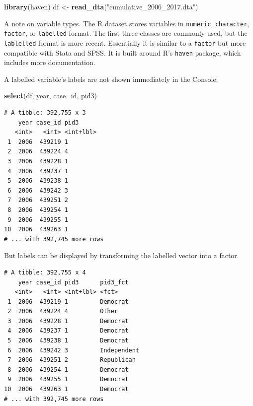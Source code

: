 \documentclass[10pt,article,oneside]{memoir}
\theoremstyle{definition}
\newenvironment{Shaded}{\begin{snugshade}}{\end{snugshade}}
\newcommand{\DataTypeTok}[1]{\textcolor[rgb]{0.13,0.29,0.53}{#1}}
\newcommand{\KeywordTok}[1]{\textcolor[rgb]{0.13,0.29,0.53}{\textbf{#1}}}
\newcommand{\NormalTok}[1]{#1}
\newcommand{\OperatorTok}[1]{\textcolor[rgb]{0.81,0.36,0.00}{\textbf{#1}}}
\newcommand{\StringTok}[1]{\textcolor[rgb]{0.31,0.60,0.02}{#1}}
\begin{document}
\begin{Shaded}
\begin{Highlighting}[]
\KeywordTok{library}\NormalTok{(haven)}
\NormalTok{df <-}\StringTok{ }\KeywordTok{read_dta}\NormalTok{(}\StringTok{"cumulative_2006_2017.dta"}\NormalTok{)}
\end{Highlighting}
\end{Shaded}

A note on variable types. The R dataset stores variables in
\texttt{numeric}, \texttt{character}, \texttt{factor}, or
\texttt{labelled} format. The first three classes are commonly used, but
the \texttt{lablelled} format is more recent. Essentially it is similar
to a \texttt{factor} but more compatible with Stata and SPSS. It is
built around R's \texttt{haven} package, which includes more
documentation.

A labelled variable's labels are not shown immediately in the Console:

\begin{Shaded}
\begin{Highlighting}[]
\KeywordTok{select}\NormalTok{(df, year, case_id, pid3)}
\end{Highlighting}
\end{Shaded}

\begin{verbatim}
# A tibble: 392,755 x 3
    year case_id pid3     
   <int>   <int> <int+lbl>
 1  2006  439219 1        
 2  2006  439224 4        
 3  2006  439228 1        
 4  2006  439237 1        
 5  2006  439238 1        
 6  2006  439242 3        
 7  2006  439251 2        
 8  2006  439254 1        
 9  2006  439255 1        
10  2006  439263 1        
# ... with 392,745 more rows
\end{verbatim}

But labels can be displayed by transforming the labelled vector into a
factor.

\begin{Shaded}
\end{Shaded}

\begin{verbatim}
# A tibble: 392,755 x 4
    year case_id pid3      pid3_fct   
   <int>   <int> <int+lbl> <fct>      
 1  2006  439219 1         Democrat   
 2  2006  439224 4         Other      
 3  2006  439228 1         Democrat   
 4  2006  439237 1         Democrat   
 5  2006  439238 1         Democrat   
 6  2006  439242 3         Independent
 7  2006  439251 2         Republican 
 8  2006  439254 1         Democrat   
 9  2006  439255 1         Democrat   
10  2006  439263 1         Democrat   
# ... with 392,745 more rows
\end{verbatim}
\end{document}
